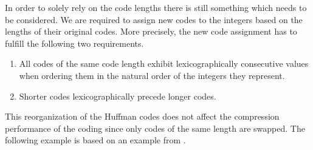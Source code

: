\documentclass[12pt]{llncs}
\begin{document}
In order to solely rely on the code lengths there is still something which needs to be considered. We are required to assign new codes to the integers based on the lengths of their original codes. More precisely, the new code assignment has to fulfill the following two requirements.
\begin{enumerate}[(1)]
	\item\label{CodeLengthsReq1} All codes of the same code length exhibit lexicographically consecutive values when ordering them in the natural order of the integers they represent.
	\item\label{CodeLengthsReq2} Shorter codes lexicographically precede longer codes.
\end{enumerate}
This reorganization of the Huffman codes does not affect the compression performance of the coding since only codes of the same length are swapped. The following example is based on an example from \cite{Deutsch96deflate}.
\end{document}

